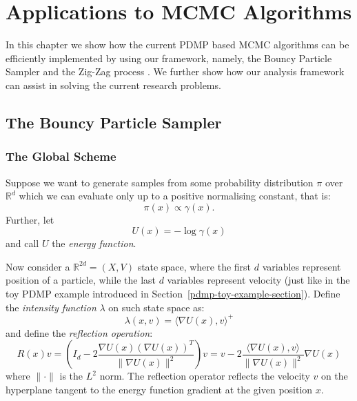 \documentclass[report.tex]{subfiles}
\begin{document}
\chapter{Applications to MCMC Algorithms}
\label{chapter-mcmc-applications}

In this chapter we show how the current PDMP based MCMC algorithms can be
efficiently implemented by using our framework, namely, the Bouncy Particle
Sampler \cite{bouchard2015bouncy} and the Zig-Zag process \cite{bierkens2016zig}.
We further show how our analysis framework can assist in solving the current
research problems.

\section{The Bouncy Particle Sampler}

\subsection{The Global Scheme}

Suppose we want to generate samples from some probability distribution
$\pi$ over $\mathbb{R}^{d}$ which we can evaluate only up to a positive normalising constant, that is:
$$
\pi(x) \propto \gamma(x).
$$
Further, let
$$
U(x) = -\log \gamma(x)
$$
and call $U$ the \textit{energy function}.

Now consider a $\mathbb{R}^{2d} = (X, V)$ state space, where the first $d$ variables represent
position of a particle, while the last $d$ variables represent velocity (just like
in the toy PDMP example introduced in Section~\ref{pdmp-toy-example-section}).
Define the \textit{intensity function} $\lambda$ on such state space as:
$$
\lambda(x, v) = \langle \nabla U(x), v \rangle^{+}
$$
and define the \textit{reflection operation}:
$$
R(x)v
= \left(I_{d} - 2\frac{\nabla U(x) (\nabla U(x))^{T}}{\lVert \nabla U(x) \rVert^{2}}\right)v
= v - 2 \frac{\langle \nabla U(x), v\rangle}{\lVert \nabla U(x) \rVert^{2}}\nabla U(x)
$$
where $\lVert \cdot \rVert$ is the $L^{2}$ norm.
The reflection operator reflects the velocity $v$ on the hyperplane tangent to the
energy function gradient at the given position $x$.
\end{document}
